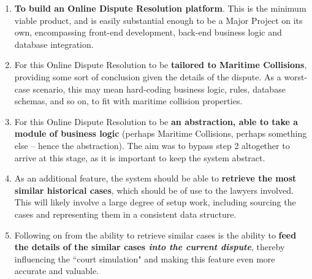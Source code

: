 \begin{enumerate}

    \item \textbf{To build an Online Dispute Resolution platform}. This is the minimum viable product, and is easily substantial enough to be a Major Project on its own, encompassing front-end development, back-end business logic and database integration.
    
    \item For this Online Dispute Resolution to be \textbf{tailored to Maritime Collisions}, providing some sort of conclusion given the details of the dispute. As a worst-case scenario, this may mean hard-coding business logic, rules, database schemas, and so on, to fit with maritime collision properties.

    \item For this Online Dispute Resolution to be \textbf{an abstraction, able to take a module of business logic} (perhaps Maritime Collisions, perhaps something else – hence the abstraction). The aim was to bypass step 2 altogether to arrive at this stage, as it is important to keep the system abstract.

    \item As an additional feature, the system should be able to \textbf{retrieve the most similar historical cases}, which should be of use to the lawyers involved. This will likely involve a large degree of setup work, including sourcing the cases and representing them in a consistent data structure.

    \item Following on from the ability to retrieve similar cases is the ability to \textbf{feed the details of the similar cases \emph{into the current dispute}}, thereby influencing the ``court simulation" and making this feature even more accurate and valuable.

\end{enumerate}